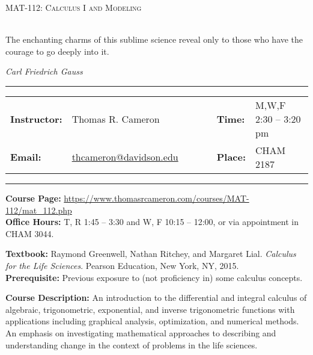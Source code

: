 \documentclass[11pt, a4paper]{article}
\begin{document}
\begin{minipage}{0.5\textwidth}
\vspace*{-5em}
{\large \textsc{MAT-112: Calculus I and Modeling}}\\
\\
\end{minipage}
\begin{minipage}{0.5\textwidth}
\epigraph{The enchanting charms of this sublime science reveal only to those who have the courage to go deeply into it.}{\textit{Carl Friedrich Gauss}}
\end{minipage}

\begin{center}
\rule{7in}{0.4pt}
\begin{minipage}[t]{.75\textwidth}
\begin{tabular}{llcccll}
\textbf{Instructor:} & Thomas R. Cameron & & &  & \textbf{Time:} & M,W,F 2:30 -- 3:20 pm\\
\textbf{Email:} &  \href{mailto:thcameron@davidson.edu}{thcameron@davidson.edu} & & & & \textbf{Place:} &  CHAM 2187
\end{tabular}
\end{minipage}
\rule{7in}{0.4pt}
\end{center}
\vspace{.5cm}
\setlength{\unitlength}{1in}
\renewcommand{\arraystretch}{2}

\noindent\textbf{Course Page:} \url{https://www.thomasrcameron.com/courses/MAT-112/mat_112.php}\\
\noindent\textbf{Office Hours:} T, R 1:45 -- 3:30 and W, F 10:15 -- 12:00, or via appointment in CHAM 3044. 

\vspace*{.15in}
\noindent\textbf{Textbook:} Raymond Greenwell, Nathan Ritchey, and Margaret Lial. \emph{Calculus for the Life Sciences}. Pearson Education, New York, NY, 2015. \\
\noindent\textbf{Prerequisite:} Previous exposure to (not proficiency in) some calculus concepts. 

\vspace*{.15in}
\noindent\textbf{Course Description:}
An introduction to the differential and integral calculus of algebraic, trigonometric, exponential, and inverse trigonometric functions with applications including graphical analysis, optimization, and numerical methods. An emphasis on investigating mathematical approaches to describing and understanding change in the context of problems in the life sciences.
\end{document}
